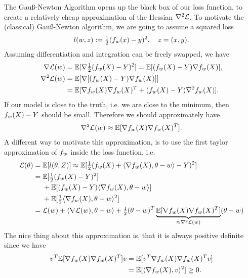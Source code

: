 The Gauß-Newton Algorithm opens up the black box of our loss function, to create
a relatively cheap approximation of the Hessian \(\nabla^2\mathcal{L}\).
To motivate the (classical) Gauß-Newton algorithm, we are going to assume a
squared loss
\begin{align*}
	l(w, z) := \tfrac12(f_{w}(x) - y)^2, \quad z=(x,y).
\end{align*}
Assuming differentiation and integration can be freely swapped, we have
\begin{align}
	\label{eq: derivative gauss newton}
	\nabla\Loss(\weights)
	&= \E[\nabla\tfrac12(\model[\weights](X)-Y)^2]
	= \E[(\model[\weights](X)-Y)\nabla\model[\weights](X)],\\
	\label{eq: hessian gauss newton}
	\nabla^2\Loss(\weights)
	&=\E[\nabla[(\model[\weights](X)-Y)\nabla\model[\weights](X)]]\\
	\nonumber
	&=\E[\nabla\model(X)\nabla\model(X)^T + (\model(X)-Y)\nabla^2\model(X)].
\end{align}
If our model is close to the truth, i.e. we are close to the minimum, then
\(f_{w}(X)-Y\) should be small. Therefore we should approximately have
\begin{align*}
	\nabla^2\mathcal{L}(w) \approx \mathbb{E}[\nabla f_{w}(X)\nabla f_{w}(X)^T].
\end{align*}
A different way to motivate this approximation, is to use the first taylor
approximation of \(f_{w}\) inside the loss function, i.e.
\begin{align*}
	\mathcal{L}(\theta)
	&= \mathbb{E}[l(\theta, Z)]
	\approx \mathbb{E}[\tfrac12(f_{w}(X) + \langle \nabla f_{w}(X), \theta-w\rangle - Y)^2]\\
	&= \begin{aligned}[t]
		&\mathbb{E}[\tfrac12(f_{w}(X)-Y)^2]\\
		&+ \mathbb{E}[(f_{w}(X)-Y)\langle \nabla f_{w}(X), \theta-w\rangle]\\
		&+ \mathbb{E}[\tfrac12\langle \nabla f_{w}(X), \theta-w\rangle^2]
	\end{aligned}\\
	&= \mathcal{L}(w) + \langle\nabla\mathcal{L}(w), \theta-w\rangle
	+ \tfrac12 (\theta-w)^T
	\underbrace{\mathbb{E}[\nabla f_{w}(X)\nabla f_{w}(X)^T]}_{\approx\nabla^2\mathcal{L}(w)}
	(\theta-w)
\end{align*}
The nice thing about this approximation is, that it is always positive definite
since we have
\begin{align*}
	 v^T \mathbb{E}[\nabla f_{w}(X)\nabla f_{w}(X)^T] v
	&= \mathbb{E}[ v^T\nabla f_{w}(X) \nabla f_{w}(X)^T v]\\
	&= \mathbb{E}[\langle \nabla f_{w}(X), v\rangle^2]\ge 0.
\end{align*}

